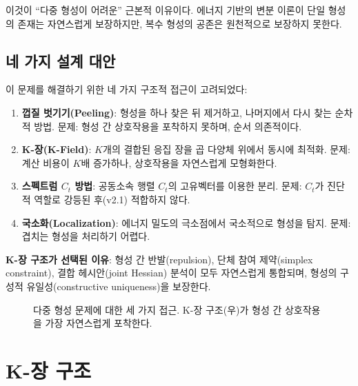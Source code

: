 이것이 ``다중 형성이 어려운'' 근본적 이유이다. 에너지 기반의 변분 이론이 단일 형성의 존재는 자연스럽게 보장하지만, 복수 형성의 공존은 원천적으로 보장하지 못한다.

\subsection{네 가지 설계 대안}

이 문제를 해결하기 위한 네 가지 구조적 접근이 고려되었다:

\begin{enumerate}
    \item \textbf{껍질 벗기기(Peeling)}: 형성을 하나 찾은 뒤 제거하고, 나머지에서 다시 찾는 순차적 방법. 문제: 형성 간 상호작용을 포착하지 못하며, 순서 의존적이다.

    \item \textbf{K-장(K-Field)}: $K$개의 결합된 응집 장을 곱 다양체 위에서 동시에 최적화. 문제: 계산 비용이 $K$배 증가하나, 상호작용을 자연스럽게 모형화한다.

    \item \textbf{스펙트럼 $C_t$ 방법}: 공동소속 행렬 $C_t$의 고유벡터를 이용한 분리. 문제: $C_t$가 진단적 역할로 강등된 후(v2.1) 적합하지 않다.

    \item \textbf{국소화(Localization)}: 에너지 밀도의 극소점에서 국소적으로 형성을 탐지. 문제: 겹치는 형성을 처리하기 어렵다.
\end{enumerate}

\textbf{K-장 구조가 선택된 이유}: 형성 간 반발(repulsion), 단체 참여 제약(simplex constraint), 결합 헤시안(joint Hessian) 분석이 모두 자연스럽게 통합되며, 형성의 구성적 유일성(constructive uniqueness)을 보장한다.

\begin{figure}[t]
\centering
{}
\caption{다중 형성 문제에 대한 세 가지 접근. K-장 구조(우)가 형성 간 상호작용을 가장 자연스럽게 포착한다.}
\label{fig:k-field-architecture}
\end{figure}


\section{K-장 구조}
\label{sec:k-field-architecture}


